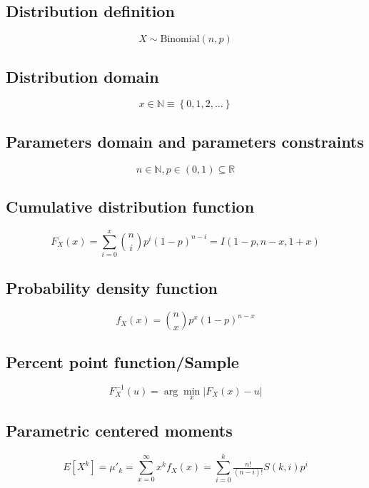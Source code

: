 \documentclass{article}
\begin{document}
\subsection{Distribution definition}
\begin{equation*} X\sim\mathrm{Binomial}\left(n,p\right) \end{equation*}
\subsection{Distribution domain}
\begin{equation*} x\in\mathbb{N}\equiv \left\{ 0,1,2,\dots \right\} \end{equation*}
\subsection{Parameters domain and parameters constraints}
\begin{equation*} n\in\mathbb{N}, p\in\left(0,1\right)\subseteq\mathbb{R} \end{equation*}
\subsection{Cumulative distribution function}
\begin{equation*} F_{X}\left(x\right)=\sum_{i=0}^{x} \binom{n}{i} p^i(1-p)^{n-i}=I(1-p, n - x, 1 + x) \end{equation*}
\subsection{Probability density function}
\begin{equation*} f_{X}\left(x\right)=\binom{n}{x} p^x (1-p)^{n-x} \end{equation*}
\subsection{Percent point function/Sample}
\begin{equation*} F^{-1}_{X}\left(u\right)=\arg\min_{x}\left| F_{X}\left(x\right)-u \right| \end{equation*}
\subsection{Parametric centered moments}
\begin{equation*} E[X^k]=\mu'_{k}=\sum_{x=0}^{\infty }x^{k}f_{X}\left(x\right)=\sum_{i=0}^k\tfrac{n!}{(n-i)!}S(k,i)p^{i} \end{equation*}
\end{document}
